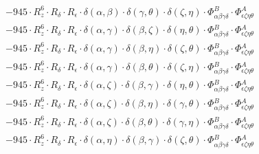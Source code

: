 \documentclass{article}
\begin{document}
\begin{equation}
\begin{array}{c}
 \\[0.2em] 		 - 945 \cdot R_{z}^{6} \cdot R_{\delta{}} \cdot R_{\epsilon{}} \cdot \delta{}\left(\alpha{}, \beta{}\right) \cdot \delta{}\left(\gamma{}, \theta{}\right) \cdot \delta{}\left(\zeta{}, \eta{}\right) \cdot \Phi{}^{B}_{\alpha{}\beta{}\gamma{}\delta{}} \cdot \Phi{}^{A}_{\epsilon{}\zeta{}\eta{}\theta{}} 
 \\[0.2em] 		 - 945 \cdot R_{z}^{6} \cdot R_{\delta{}} \cdot R_{\epsilon{}} \cdot \delta{}\left(\alpha{}, \gamma{}\right) \cdot \delta{}\left(\beta{}, \zeta{}\right) \cdot \delta{}\left(\eta{}, \theta{}\right) \cdot \Phi{}^{B}_{\alpha{}\beta{}\gamma{}\delta{}} \cdot \Phi{}^{A}_{\epsilon{}\zeta{}\eta{}\theta{}} 
 \\[0.2em] 		 - 945 \cdot R_{z}^{6} \cdot R_{\delta{}} \cdot R_{\epsilon{}} \cdot \delta{}\left(\alpha{}, \gamma{}\right) \cdot \delta{}\left(\beta{}, \eta{}\right) \cdot \delta{}\left(\zeta{}, \theta{}\right) \cdot \Phi{}^{B}_{\alpha{}\beta{}\gamma{}\delta{}} \cdot \Phi{}^{A}_{\epsilon{}\zeta{}\eta{}\theta{}} 
 \\[0.2em] 		 - 945 \cdot R_{z}^{6} \cdot R_{\delta{}} \cdot R_{\epsilon{}} \cdot \delta{}\left(\alpha{}, \gamma{}\right) \cdot \delta{}\left(\beta{}, \theta{}\right) \cdot \delta{}\left(\zeta{}, \eta{}\right) \cdot \Phi{}^{B}_{\alpha{}\beta{}\gamma{}\delta{}} \cdot \Phi{}^{A}_{\epsilon{}\zeta{}\eta{}\theta{}} 
 \\[0.2em] 		 - 945 \cdot R_{z}^{6} \cdot R_{\delta{}} \cdot R_{\epsilon{}} \cdot \delta{}\left(\alpha{}, \zeta{}\right) \cdot \delta{}\left(\beta{}, \gamma{}\right) \cdot \delta{}\left(\eta{}, \theta{}\right) \cdot \Phi{}^{B}_{\alpha{}\beta{}\gamma{}\delta{}} \cdot \Phi{}^{A}_{\epsilon{}\zeta{}\eta{}\theta{}} 
 \\[0.2em] 		 - 945 \cdot R_{z}^{6} \cdot R_{\delta{}} \cdot R_{\epsilon{}} \cdot \delta{}\left(\alpha{}, \zeta{}\right) \cdot \delta{}\left(\beta{}, \eta{}\right) \cdot \delta{}\left(\gamma{}, \theta{}\right) \cdot \Phi{}^{B}_{\alpha{}\beta{}\gamma{}\delta{}} \cdot \Phi{}^{A}_{\epsilon{}\zeta{}\eta{}\theta{}} 
 \\[0.2em] 		 - 945 \cdot R_{z}^{6} \cdot R_{\delta{}} \cdot R_{\epsilon{}} \cdot \delta{}\left(\alpha{}, \zeta{}\right) \cdot \delta{}\left(\beta{}, \theta{}\right) \cdot \delta{}\left(\gamma{}, \eta{}\right) \cdot \Phi{}^{B}_{\alpha{}\beta{}\gamma{}\delta{}} \cdot \Phi{}^{A}_{\epsilon{}\zeta{}\eta{}\theta{}} 
 \\[0.2em] 		 - 945 \cdot R_{z}^{6} \cdot R_{\delta{}} \cdot R_{\epsilon{}} \cdot \delta{}\left(\alpha{}, \eta{}\right) \cdot \delta{}\left(\beta{}, \gamma{}\right) \cdot \delta{}\left(\zeta{}, \theta{}\right) \cdot \Phi{}^{B}_{\alpha{}\beta{}\gamma{}\delta{}} \cdot \Phi{}^{A}_{\epsilon{}\zeta{}\eta{}\theta{}} 

\end{array}
\end{equation}
\end{document}
